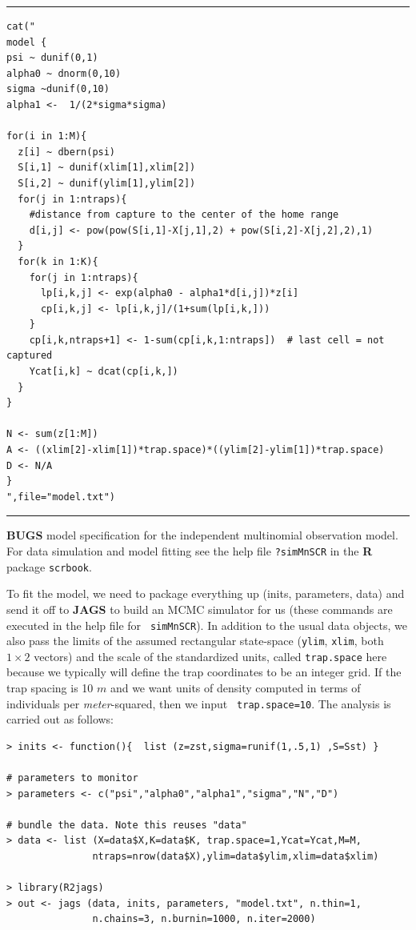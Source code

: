\begin{panel}[htp]
\centering
\rule[0.15in]{\textwidth}{.03in}
{\small
\begin{verbatim}
cat("
model {
psi ~ dunif(0,1)
alpha0 ~ dnorm(0,10)
sigma ~dunif(0,10)
alpha1 <-  1/(2*sigma*sigma)

for(i in 1:M){
  z[i] ~ dbern(psi)
  S[i,1] ~ dunif(xlim[1],xlim[2])
  S[i,2] ~ dunif(ylim[1],ylim[2])
  for(j in 1:ntraps){
    #distance from capture to the center of the home range
    d[i,j] <- pow(pow(S[i,1]-X[j,1],2) + pow(S[i,2]-X[j,2],2),1)
  }
  for(k in 1:K){
    for(j in 1:ntraps){
      lp[i,k,j] <- exp(alpha0 - alpha1*d[i,j])*z[i]
      cp[i,k,j] <- lp[i,k,j]/(1+sum(lp[i,k,]))
    }
    cp[i,k,ntraps+1] <- 1-sum(cp[i,k,1:ntraps])  # last cell = not captured
    Ycat[i,k] ~ dcat(cp[i,k,])
  }
}

N <- sum(z[1:M])
A <- ((xlim[2]-xlim[1])*trap.space)*((ylim[2]-ylim[1])*trap.space)
D <- N/A
}
",file="model.txt")

\end{verbatim}
}
\rule[-0.15in]{\textwidth}{.03in}
\caption{
{\bf BUGS} model specification for the independent multinomial
observation model. For data simulation and model fitting see the
help file \mbox{\tt ?simMnSCR} in the {\bf R} package \mbox{\tt scrbook}.
}
\label{poisson-mn.panel.mn}
\end{panel}

To fit the model, we need to package everything up (inits, parameters,
data) and send it off to \mbox{\bf JAGS} to build an MCMC simulator
for us (these commands are executed in the help file for \mbox{\tt
  simMnSCR}). In addition to the usual data objects, we also pass
the limits of the assumed rectangular state-space (\mbox{\tt ylim},
\mbox{\tt xlim}, both $1 \times 2$ vectors) and the scale of the
standardized units, called \mbox{\tt trap.space} here because we
typically will define the trap coordinates to be an integer grid. If
the trap spacing is 10 $m$ and we want units of density computed in
terms of individuals  per {\it meter}-squared, then we input \mbox{\tt
  trap.space=10}. The analysis is carried out as follows:
\begin{samepage}
{\small
\begin{verbatim}
> inits <- function(){  list (z=zst,sigma=runif(1,.5,1) ,S=Sst) }

# parameters to monitor
> parameters <- c("psi","alpha0","alpha1","sigma","N","D")

# bundle the data. Note this reuses "data"
> data <- list (X=data$X,K=data$K, trap.space=1,Ycat=Ycat,M=M,
               ntraps=nrow(data$X),ylim=data$ylim,xlim=data$xlim)

> library(R2jags)
> out <- jags (data, inits, parameters, "model.txt", n.thin=1,
               n.chains=3, n.burnin=1000, n.iter=2000)
\end{verbatim}
}
\end{samepage}

